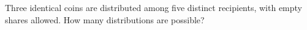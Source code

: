 Three identical coins are distributed among five distinct recipients, with empty shares allowed. How many distributions are possible?
